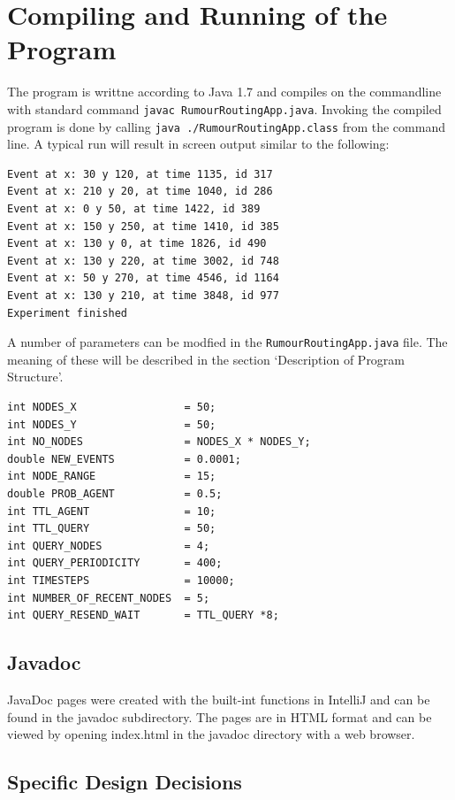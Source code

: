 \documentclass[a4paper,11pt,twoside]{article}
\begin{document}
\section{Compiling and Running of the Program}

The program is writtne according to Java 1.7 and compiles on the
commandline with standard command \texttt{javac RumourRoutingApp.java}.
Invoking the compiled program is done by calling \texttt{java
  ./RumourRoutingApp.class} from the command line.
A typical run will result in screen output similar to the following:
\begin{verbatim}
Event at x: 30 y 120, at time 1135, id 317 
Event at x: 210 y 20, at time 1040, id 286 
Event at x: 0 y 50, at time 1422, id 389 
Event at x: 150 y 250, at time 1410, id 385 
Event at x: 130 y 0, at time 1826, id 490 
Event at x: 130 y 220, at time 3002, id 748 
Event at x: 50 y 270, at time 4546, id 1164 
Event at x: 130 y 210, at time 3848, id 977 
Experiment finished
\end{verbatim}

A number of parameters can be modfied in the
\texttt{RumourRoutingApp.java} file. The meaning of these will be
described in the section `Description of Program Structure'.  
\begin{verbatim}
int NODES_X                 = 50;
int NODES_Y                 = 50;
int NO_NODES                = NODES_X * NODES_Y;
double NEW_EVENTS           = 0.0001;
int NODE_RANGE              = 15;
double PROB_AGENT           = 0.5;
int TTL_AGENT               = 10;
int TTL_QUERY               = 50;
int QUERY_NODES             = 4;
int QUERY_PERIODICITY       = 400;
int TIMESTEPS               = 10000;
int NUMBER_OF_RECENT_NODES  = 5;
int QUERY_RESEND_WAIT       = TTL_QUERY *8;
\end{verbatim}



\subsection{Javadoc}
JavaDoc pages were created with the built-int functions in IntelliJ
and can be found in the javadoc subdirectory. The pages are in HTML
format and can be viewed by opening index.html in the javadoc
directory with a web browser. 

\subsection{Specific Design Decisions}
\end{document}

